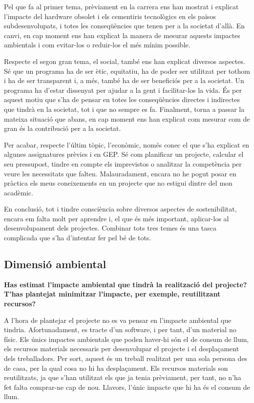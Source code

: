 \documentclass[a4paper]{article}
\begin{document}
Pel que fa al primer tema, prèviament en la carrera ens han mostrat i explicat l'impacte del hardware obsolet i els cementiris tecnològics en els països subdesenvolupats, i totes les conseqüències que tenen per a la societat d'allà. En canvi, en cap moment ens han explicat la manera de mesurar aquests impactes ambientals i com evitar-los o reduir-los el més mínim possible.

Respecte el segon gran tema, el social, també ens han explicat diversos aspectes. Sé que un programa ha de ser ètic, equitatiu, ha de poder ser utilitzat per tothom i ha de ser transparent i, a més, també ha de ser beneficiós per a la societat. Un programa ha d'estar dissenyat per ajudar a la gent i facilitar-los la vida. És per aquest motiu que s'ha de pensar en totes les conseqüències directes i indirectes que tindrà en la societat, tot i que no sempre es fa. Finalment, torna a passar la mateixa situació que abans, en cap moment ens han explicat com mesurar com de gran és la contribució per a la societat.

Per acabar, respecte l'últim tòpic, l'econòmic, només conec el que s'ha explicat en algunes assignatures prèvies i en GEP. Sé com planificar un projecte, calcular el seu pressupost, tindre en compte els imprevistos o analitzar la competència per veure les necessitats que falten. Malauradament, encara no he pogut posar en pràctica els meus coneixements en un projecte que no estigui dintre del mon acadèmic.

En conclusió, tot i tindre consciència sobre diversos aspectes de sostenibilitat, encara em falta molt per aprendre i, el que és més important, aplicar-los al desenvolupament dels projectes. Combinar tots tres temes és una tasca complicada que s'ha d'intentar fer pel bé de tots.

\subsection{Dimensió ambiental}

\setlength{\parindent}{0cm}

\textbf{Has estimat l'impacte ambiental que tindrà la realització del projecte? T'has plantejat minimitzar l'impacte, per exemple, reutilitzant recursos?}

A l'hora de plantejar el projecte no es va pensar en l'impacte ambiental que tindria. Afortunadament, es tracte d'un software, i per tant, d'un material no físic. Els únics impactes ambientals que poden haver-hi són el de consum de llum, els recursos materials necessaris per desenvolupar el projecte i el desplaçament dels treballadors. Per sort, aquest és un treball realitzat per una sola persona des de casa, per la qual cosa no hi ha desplaçament. Els recursos materials son reutilitzats, ja que s'han utilitzat els que ja tenia prèviament, per tant, no n'ha fet falta comprar-ne cap de nou. Llavors, l'únic impacte que hi ha és el consum de llum.
\end{document}
